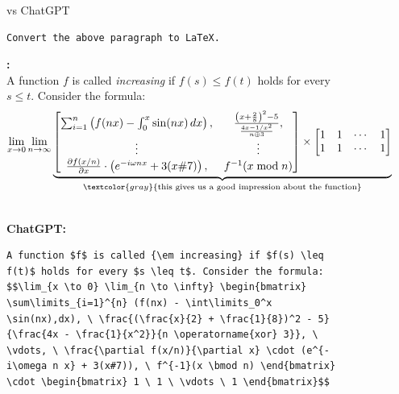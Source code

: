 \begin{figure}[H]
\begin{AIbox}{\DV vs ChatGPT}
\begin{verbatim}
Convert the above paragraph to LaTeX.
\end{verbatim}

\parbox[t]{\linewidth}{{\bf \DV:}\\\scriptsize
A function $f$ is called \emph{increasing} if $f(s) \leq f(t)$ holds for every $s \leq t$. Consider the formula:
\[
\lim_{x \to 0} \lim_{n \to \infty} \underbrace{ \begin{bmatrix} \sum_{i = 1}^n \left(f(nx) - \int_0^x \sin(nx) \, dx \right), & \frac{\left(x + \frac{2}{8}\right)^2 - 5}{\frac{4x-1/x^2}{n \oplus 3}}, \\ \vdots & \vdots \\ \frac{\partial f(x/n)}{\partial x} \cdot  \left(e^{-i \omega n x} + 3(x\#7) \right), & f^{-1} (x \bmod n) \end{bmatrix}  \times  \begin{bmatrix} 1 & 1 & \cdots & 1 \\ 1 & 1 & \cdots & 1 \end{bmatrix} }_{\textcolor{gray}{\text{this gives us a good impression about the function}}}
\]}\\
{\bf ChatGPT:}
\begin{verbatim}
A function $f$ is called {\em increasing} if $f(s) \leq f(t)$ holds for every $s \leq t$. Consider the formula:
$$\lim_{x \to 0} \lim_{n \to \infty} \begin{bmatrix} \sum\limits_{i=1}^{n} (f(nx) - \int\limits_0^x \sin(nx),dx), \ \frac{(\frac{x}{2} + \frac{1}{8})^2 - 5}{\frac{4x - \frac{1}{x^2}}{n \operatorname{xor} 3}}, \ \vdots, \ \frac{\partial f(x/n)}{\partial x} \cdot (e^{-i\omega n x} + 3(x#7)), \ f^{-1}(x \bmod n) \end{bmatrix} \cdot \begin{bmatrix} 1 \ 1 \ \vdots \ 1 \end{bmatrix}$$

\end{verbatim}
\end{AIbox}
\end{figure}
